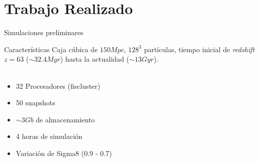 \documentclass{beamer}
\begin{document}
\section{Trabajo Realizado}
\begin{frame}{Simulaciones preliminares}
	\begin{block}{Características}
		Caja cúbica de $150 Mpc$, $128^3$ partículas, tiempo inicial de \textit{redshift} $z=63$ ($\sim 32.4 Myr$) hasta la actualidad ($\sim 13Gyr$).\\~\\
		\begin{itemize}
			\item 32 Procesadores (fiscluster)
			\item 50 snapshots
			\item $\sim 3Gb$ de almacenamiento
			\item 4 horas de simulación
			\item Variación de Sigma8 (0.9 - 0.7)
		\end{itemize}
	\end{block}	
\end{frame}
\end{document}
